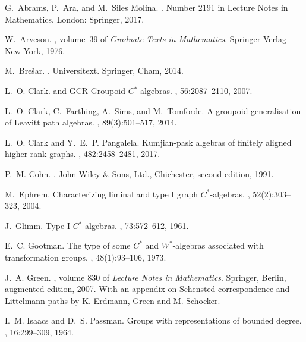 \documentclass[11pt,reqno]{amsart}
\theoremstyle{plain}
\numberwithin{equation}{section}
\begin{document}
\begin{thebibliography}{10}

G.~{Abrams}, P.~{Ara}, and M.~{Siles Molina}.
.
\newblock Number 2191 in Lecture Notes in Mathematics. London: Springer, 2017.

W.~Arveson.
, volume~39 of {\em
  Graduate Texts in Mathematics}.
\newblock Springer-Verlag New York, 1976.

M.~Bre\v{s}ar.
.
\newblock Universitext. Springer, Cham, 2014.

L.~O. Clark.
 and {GCR} {G}roupoid {$C{^\ast}$}-algebras.
, 56:2087--2110, 2007.

L.~O. Clark, C.~Farthing, A.~Sims, and M.~Tomforde.
\newblock A groupoid generalisation of {L}eavitt path algebras.
, 89(3):501--517, 2014.

L.~O. Clark and Y.~E.~P. Pangalela.
\newblock Kumjian-pask algebras of finitely aligned higher-rank graphs.
, 482:2458--2481, 2017.

P.~M. Cohn.
.
\newblock John Wiley \& Sons, Ltd., Chichester, second edition, 1991.

M.~Ephrem.
\newblock Characterizing liminal and type {I} graph {$C^\ast$}-algebras.
, 52(2):303--323, 2004.

J.~Glimm.
\newblock Type {I} {$C{^\ast}$}-algebras.
, 73:572--612, 1961.

E.~C. Gootman.
\newblock The type of some {$C^{\ast}$} and {$W^{\ast}$}-algebras associated
  with transformation groups.
, 48(1):93--106, 1973.

J.~A. Green.
, volume 830 of
  {\em Lecture Notes in Mathematics}.
\newblock Springer, Berlin, augmented edition, 2007.
\newblock With an appendix on Schensted correspondence and Littelmann paths by
  K. Erdmann, Green and M. Schocker.

I.~M. Isaacs and D.~S. Passman.
\newblock Groups with representations of bounded degree.
, 16:299--309, 1964.


\end{thebibliography}
\end{document}
